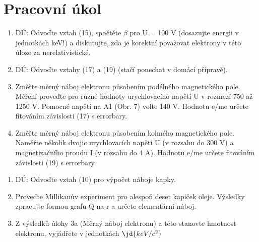 \section{Pracovní úkol}
\begin{enumerate}
\item DÚ: Odvoďte vztah (15), spočtěte $\beta$ pro U = 100 V (dosazujte energii v jednotkách
keV!) a diskutujte, zda je korektní považovat elektrony v této úloze za
nerelativistické.
\item DÚ: Odvoďte vztahy (17) a (19) (stačí ponechat v domácí přípravě).
\item Změřte měrný náboj elektronu působením podélného magnetického pole. Měření proveďte
pro různé hodnoty urychlovacího napětí U v rozmezí 750 až 1250 V. Pomocné napětí na
A1 (Obr. 7) volte 140 V. Hodnotu e/me určete fitováním závislosti (17) s errorbary.
\item Změřte měrný náboj elektronu působením kolmého magnetického pole. Naměřte několik
dvojic urychlovacích napětí U (v rozsahu do 300 V) a magnetizačního proudu I (v rozsahu
do 4 A). Hodnotu e/me určete fitováním závislosti (19) s errorbary.

\end{enumerate}


\begin{enumerate}
\item DÚ: Odvoďte vztah (10) pro výpočet náboje kapky.
\item Proveďte Millikanův experiment pro alespoň deset kapiček oleje. Výsledky zpracujte formou
grafu Q na r a určete elementární náboj.
\item Z výsledků úlohy 3a (Měrný náboj elektronu) a této stanovte hmotnost elektronu, vyjádřete
v jednotkách $\jd{keV/c^2}$

\end{enumerate}

